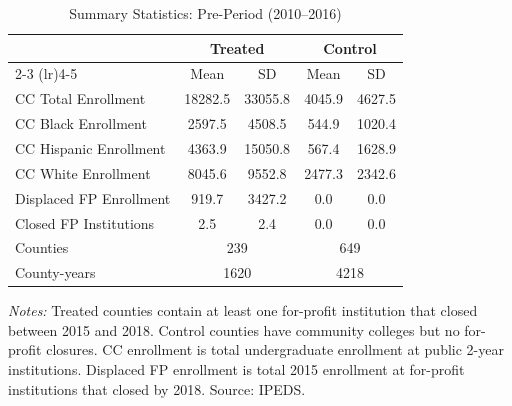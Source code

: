 \begin{table}[htbp]
\centering
\caption{Summary Statistics: Pre-Period (2010--2016)}
\label{tab:summary}
\begin{threeparttable}
\begin{tabular}{l cc cc}
\toprule
 & \multicolumn{2}{c}{Treated} & \multicolumn{2}{c}{Control} \\
\cmidrule(lr){2-3} \cmidrule(lr){4-5}
 & Mean & SD & Mean & SD \\
\midrule
CC Total Enrollment & 18282.5 & 33055.8 & 4045.9 & 4627.5 \\
CC Black Enrollment & 2597.5 & 4508.5 & 544.9 & 1020.4 \\
CC Hispanic Enrollment & 4363.9 & 15050.8 & 567.4 & 1628.9 \\
CC White Enrollment & 8045.6 & 9552.8 & 2477.3 & 2342.6 \\
Displaced FP Enrollment & 919.7 & 3427.2 & 0.0 & 0.0 \\
Closed FP Institutions & 2.5 & 2.4 & 0.0 & 0.0 \\
\midrule
Counties & \multicolumn{2}{c}{239} & \multicolumn{2}{c}{649} \\
County-years & \multicolumn{2}{c}{1620} & \multicolumn{2}{c}{4218} \\
\bottomrule
\end{tabular}
\begin{tablenotes}[flushleft]
\small
\item \textit{Notes:} Treated counties contain at least one for-profit institution that closed between 2015 and 2018. Control counties have community colleges but no for-profit closures. CC enrollment is total undergraduate enrollment at public 2-year institutions. Displaced FP enrollment is total 2015 enrollment at for-profit institutions that closed by 2018. Source: IPEDS.
\end{tablenotes}
\end{threeparttable}
\end{table}

